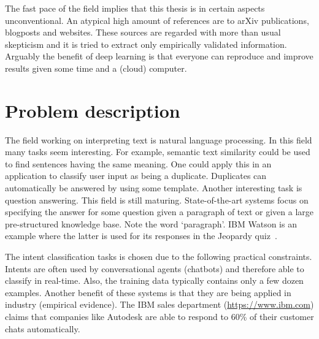 The fast pace of the field implies that this thesis is in certain aspects unconventional.
An atypical high amount of references are to arXiv publications, blogposts and websites.
These sources are regarded with more than usual skepticism and it is tried to extract only empirically validated information.
Arguably the benefit of deep learning is that everyone can reproduce and improve results given some time and a (cloud) computer.

\section{Problem description}
\label{sec:problem_description}
The field working on interpreting text is natural language processing.
In this field many tasks seem interesting.
For example, semantic text similarity could be used to find sentences having the same meaning.
One could apply this in an application to classify user input as being a duplicate.
Duplicates can automatically be answered by using some template.
Another interesting task is question answering.
This field is still maturing.
State-of-the-art systems focus on specifying the answer for some question given a paragraph of text or given a large pre-structured knowledge base.
Note the word `paragraph'.
IBM Watson is an example where the latter is used for its responses in the Jeopardy quiz~\citep{high2012era}.

The intent classification tasks is chosen due to the following practical constraints.
Intents are often used by conversational agents (chatbots) and therefore able to classify in real-time.
Also, the training data typically contains only a few dozen examples.
Another benefit of these systems is that they are being applied in industry (empirical evidence).
The IBM sales department (\url{https://www.ibm.com}) claims that companies like Autodesk are able to respond to 60\% of their customer chats automatically.

